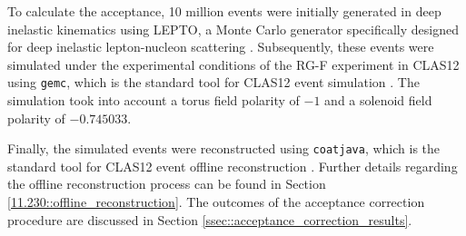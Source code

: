     To calculate the acceptance, 10 million events were initially generated in deep inelastic kinematics using LEPTO, a Monte Carlo generator specifically designed for deep inelastic lepton-nucleon scattering \cite{ingelman1997}.
    Subsequently, these events were simulated under the experimental conditions of the RG-F experiment in CLAS12 using \texttt{gemc}, which is the standard tool for CLAS12 event simulation \cite{ungaro2020gemc}.
    The simulation took into account a torus field polarity of $-1$ and a solenoid field polarity of $-0.745033$.

    Finally, the simulated events were reconstructed using \texttt{coatjava}, which is the standard tool for CLAS12 event offline reconstruction \cite{ziegler2020}.
    Further details regarding the offline reconstruction process can be found in Section \ref{11.230::offline_reconstruction}.
    The outcomes of the acceptance correction procedure are discussed in Section \ref{ssec::acceptance_correction_results}.
